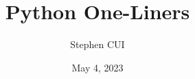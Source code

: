 \documentclass[openany]{book}
\title{\textbf{Python One-Liners}}
\author{Stephen CUI}
\date{May 4, 2023}
\begin{document}
\maketitle

\begin{multicols}{2}
    \tableofcontents
\end{multicols}



\end{document}
